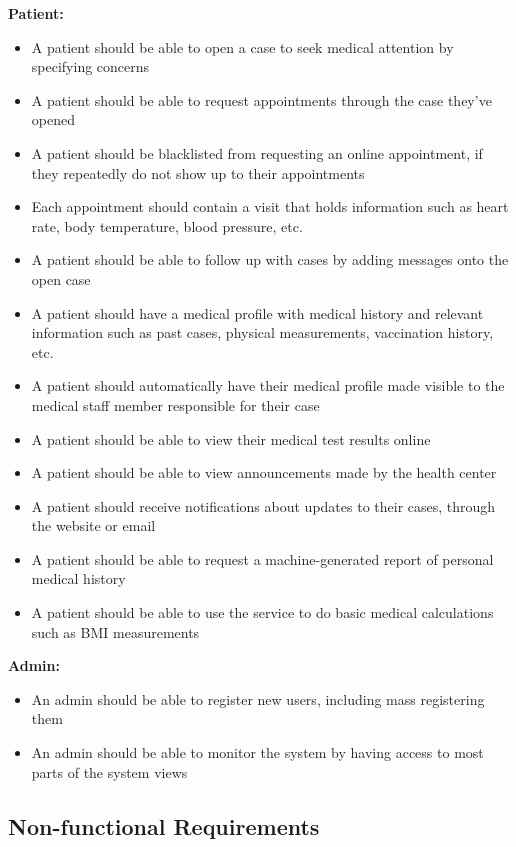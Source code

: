 \documentclass[a4paper, 12pt, titlepage]{article}
\begin{document}
  \textbf{Patient:}
  \begin{itemize}
    \item A patient should be able to open a case to seek medical attention by specifying concerns
    \item A patient should be able to request appointments through the case they've opened
    \item A patient should be blacklisted from requesting an online appointment, if they repeatedly do not show up to their appointments
    \item Each appointment should contain a visit that holds information such as heart rate, body temperature, blood pressure, etc.
    \item A patient should be able to follow up with cases by adding messages onto the open case
    \item A patient should have a medical profile with medical history and relevant information such as past cases, physical measurements, vaccination history, etc.
    \item A patient should automatically have their medical profile made visible to the medical staff member responsible for their case
    \item A patient should be able to view their medical test results online
    \item A patient should be able to view announcements made by the health center
    \item A patient should receive notifications about updates to their cases, through the website or email
    \item A patient should be able to request a machine-generated report of personal medical history
    \item A patient should be able to use the service to do basic medical calculations such as BMI measurements
  \end{itemize}

  \textbf{Admin:}
  \begin{itemize}
    \item An admin should be able to register new users, including mass registering them
    \item An admin should be able to monitor the system by having access to most parts of the system views
  \end{itemize}

  \pagebreak
  \subsection{Non-functional Requirements}
\end{document}
